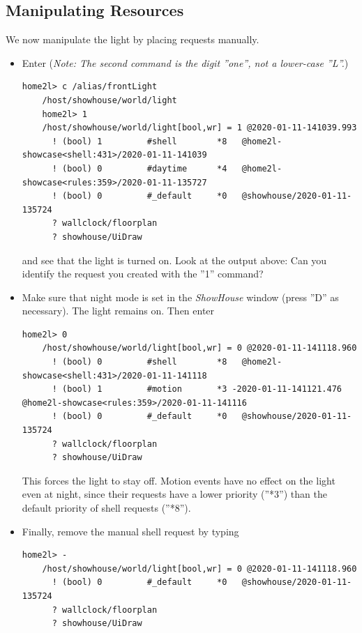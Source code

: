 \documentclass[12pt,english,parskip=half,headheight=19pt]{scrreprt}
\begin{document}
\subsection{Manipulating Resources}
\label{sec:tutorial-shell-manipulate}


We now manipulate the light by placing requests manually.

\begin{itemize}[$\blacktriangleright$]

\item
  Enter (\textit{Note: The second command is the digit ''one'', not a
  lower-case ''L''.})
  \begin{lstlisting}[language=home2l]
    home2l> c /alias/frontLight
    /host/showhouse/world/light
    home2l> 1
    /host/showhouse/world/light[bool,wr] = 1 @2020-01-11-141039.993
      ! (bool) 1         #shell        *8   @home2l-showcase<shell:431>/2020-01-11-141039
      ! (bool) 0         #daytime      *4   @home2l-showcase<rules:359>/2020-01-11-135727
      ! (bool) 0         #_default     *0   @showhouse/2020-01-11-135724
      ? wallclock/floorplan
      ? showhouse/UiDraw
  \end{lstlisting}
  and see that the light is turned on. Look at the output above: Can you
  identify the request you created with the ''1'' command?

\item
  Make sure that night mode is set in the \textit{ShowHouse} window (press ''D'' as necessary). The
  light remains on. Then enter
  \begin{lstlisting}[language=home2l]
    home2l> 0
    /host/showhouse/world/light[bool,wr] = 0 @2020-01-11-141118.960
      ! (bool) 0         #shell        *8   @home2l-showcase<shell:431>/2020-01-11-141118
      ! (bool) 1         #motion       *3 -2020-01-11-141121.476   @home2l-showcase<rules:359>/2020-01-11-141116
      ! (bool) 0         #_default     *0   @showhouse/2020-01-11-135724
      ? wallclock/floorplan
      ? showhouse/UiDraw
  \end{lstlisting}
  This forces the light to stay off. Motion events have no effect on the
  light even at night, since their requests have a lower priority
  (''*3'') than the default priority of shell requests (''*8'').

\item
  Finally, remove the manual shell request by typing
  \begin{lstlisting}[language=home2l]
    home2l> -
    /host/showhouse/world/light[bool,wr] = 0 @2020-01-11-141118.960
      ! (bool) 0         #_default     *0   @showhouse/2020-01-11-135724
      ? wallclock/floorplan
      ? showhouse/UiDraw
  \end{lstlisting}

\end{itemize}
\end{document}
